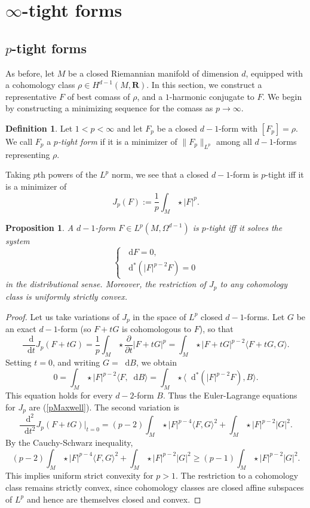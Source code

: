 \documentclass[reqno,11pt]{amsart}
\newcommand{\RR}{\mathbf{R}}
\newcommand*\dif{\mathop{}\!\mathrm{d}}
\newcommand{\dfn}[1]{\emph{#1}\index{#1}}
\newtheorem{proposition}[theorem]{Proposition}
\theoremstyle{definition}
\newtheorem{definition}[theorem]{Definition}
\numberwithin{equation}{section}
\begin{document}
\section{\texorpdfstring{$\infty$-tight forms}{Infinity-tight forms}}\label{tight forms sec}
\subsection{\texorpdfstring{$p$-tight forms}{p-tight forms}}
As before, let $M$ be a closed Riemannian manifold of dimension $d$, equipped with a cohomology class $\rho \in H^{d - 1}(M, \RR)$.
In this section, we construct a representative $F$ of best comass of $\rho$, and a $1$-harmonic conjugate to $F$.
We begin by constructing a minimizing sequence for the comass as $p \to \infty$.

\begin{definition}
Let $1 < p < \infty$ and let $F_p$ be a closed $d - 1$-form with $[F_p] = \rho$.
We call $F_p$ a \dfn{$p$-tight form} if it is a minimizer of $\|F_p\|_{L^p}$ among all $d - 1$-forms representing $\rho$.
\end{definition}

Taking $p$th powers of the $L^p$ norm, we see that a closed $d - 1$-form is $p$-tight iff it is a minimizer of
$$J_p(F) := \frac{1}{p} \int_M \star |F|^p.$$

\begin{proposition}
A $d - 1$-form $F \in L^p(M, \Omega^{d - 1})$ is $p$-tight iff it solves the system
\begin{equation}\label{pMaxwell}
\begin{cases}
	\dif F = 0, \\
	\dif^*(|F|^{p - 2} F) = 0
\end{cases}
\end{equation}
in the distributional sense. Moreover, the restriction of $J_p$ to any cohomology class is uniformly strictly convex.
\end{proposition}
\begin{proof}
Let us take variations of $J_p$ in the space of $L^p$ closed $d-1$-forms.
Let $G$ be an exact $d - 1$-form (so $F + tG$ is cohomologous to $F$), so that
$$\frac{\dif}{\dif t} J_p(F + tG) = \frac{1}{p} \int_M \star \frac{\partial}{\partial t} |F + tG|^p = \int_M \star |F + tG|^{p - 2} \langle F + tG, G\rangle.$$
Setting $t = 0$, and writing $G = \dif B$, we obtain 
$$0 = \int_M \star |F|^{p - 2} \langle F, \dif B\rangle = \int_M \star \langle \dif^*(|F|^{p - 2} F), B\rangle.$$
This equation holds for every $d - 2$-form $B$.
Thus the Euler-Lagrange equations for $J_p$ are (\ref{pMaxwell}).
The second variation is 
$$\frac{\dif^2}{\dif t^2} J_p(F + tG)\bigg|_{t = 0} = (p - 2) \int_M \star |F|^{p - 4} \langle F, G\rangle^2 + \int_M \star |F|^{p - 2} |G|^2.$$
By the Cauchy-Schwarz inequality,
$$(p - 2) \int_M \star |F|^{p - 4} \langle F, G\rangle^2 + \int_M \star |F|^{p - 2} |G|^2 \geq (p - 1) \int_M \star |F|^{p - 2} |G|^2.$$
This implies uniform strict convexity for $p > 1$.
The restriction to a cohomology class remains strictly convex, since cohomology classes are closed affine subspaces of $L^p$ and hence are themselves closed and convex.
\end{proof}
\end{document}
